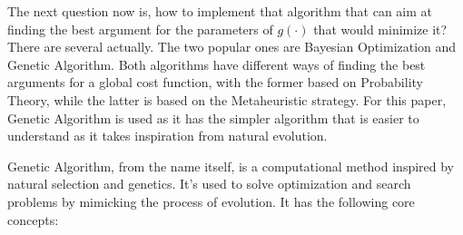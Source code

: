 The next question now is, how to implement that algorithm that can aim at finding the best argument for the parameters of $g(\cdot)$ that would minimize it? There are several actually. The two popular ones are Bayesian Optimization and Genetic Algorithm. Both algorithms have different ways of finding the best arguments for a global cost function, with the former based on Probability Theory, while the latter is based on the Metaheuristic strategy. For this paper, Genetic Algorithm is used as it has the simpler algorithm that is easier to understand as it takes inspiration from natural evolution.

Genetic Algorithm, from the name itself, is a computational method inspired by natural selection and genetics. It's used to solve optimization and search problems by mimicking the process of evolution. It has the following core concepts: 
